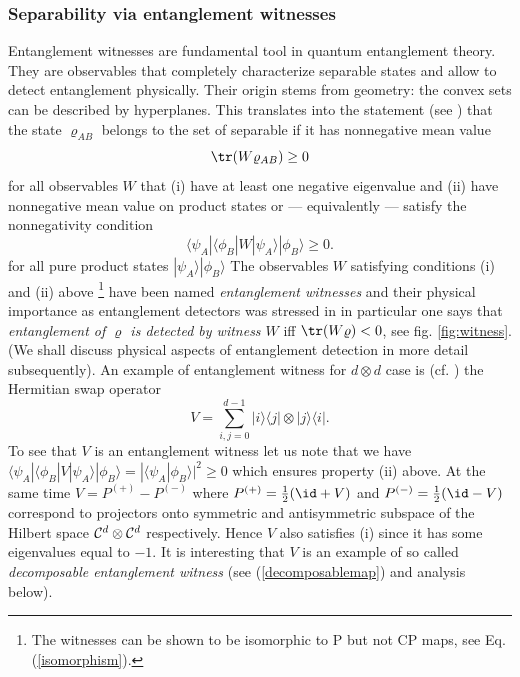 \documentclass[twocolumn,aps,rmp]{revtex4}
\begin{document}
\subsubsection{Separability via entanglement
witnesses\label{subsubsec:Witnesses}}

Entanglement witnesses \cite{sep1996,TerhalB} are fundamental tool in
quantum entanglement theory. They are observables that completely
characterize separable states and allow to detect entanglement
physically. Their origin stems from geometry: the convex sets can be
described by hyperplanes. This translates into the statement (see
\cite{sep1996,TerhalB}) that the state $\varrho_{AB}$ belongs to the
set of separable if it has nonnegative mean value
\begin{equation}
{\tr}(W\varrho_{AB} )\geq 0 \label{witnesscondition-v1}
\end{equation}
for all observables $W$ that (i) have at least one negative eigenvalue
and (ii) have nonnegative mean value on product states or ---
equivalently --- satisfy the nonnegativity condition
\begin{equation}
\langle \psi_{A}|\langle \phi_{B}| W
|\psi_{A}\rangle|\phi_{B}\rangle \geq 0. \label{witnesscondition-v2}
\end{equation}
for all pure product states $|\psi_{A}\rangle|\phi_{B}\rangle$ The
observables $W$ satisfying conditions (i) and (ii) above \footnote{The
  witnesses can be shown to be isomorphic to P but not CP maps, see
  Eq. (\ref{isomorphism}).} have been named {\it entanglement
  witnesses} and their physical importance as entanglement detectors
was stressed in \cite{TerhalB} in particular one says that
\emph{entanglement of $\varrho$ is detected by witness $W$} iff
${\tr}(W\varrho)<0$, see fig. \ref{fig:witness}.  (We shall discuss
physical aspects of entanglement detection in more detail
subsequently).  An example of entanglement witness for $d \otimes d$
case is (cf. \cite{Werner1989}) the Hermitian swap operator
\begin{equation}
V=\sum_{i,j=0}^{d-1}|i\rangle\langle j| \otimes |j\rangle\langle i|.
\label{swap}
\end{equation}
To see that $V$ is an entanglement witness let us note that we
have$\langle \psi_{A}|\langle \phi_{B}| V
|\psi_{A}\rangle|\phi_{B}\rangle= |\langle
\psi_{A}|\phi_{B}\rangle|^{2} \geq 0$ which ensures property (ii)
above. At the same time $V=P^{(+)} - P^{(-)}$ where $P^{(+)}={1\over 2}(\id + V)$ and
$P^{(-)}={1\over 2}(\id - V)$ correspond to projectors onto symmetric and antisymmetric
subspace of the Hilbert space ${\cal C}^{d} \otimes {\cal C}^{d}$
respectively.  Hence $V$ also satisfies (i) since it has some
eigenvalues equal to $-1$. It is interesting that $V$ is an example of
so called {\it decomposable entanglement witness} (see
(\ref{decomposablemap}) and analysis below).
\end{document}
